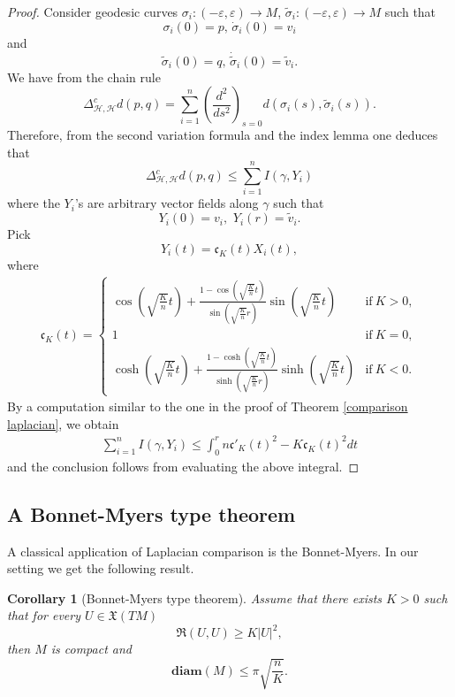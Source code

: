 \documentclass[11pt]{article}
\numberwithin{equation}{section}
\newtheorem{corollary}[theorem]{Corollary}
\newcommand{\Ho}{\mathcal H}
\begin{document}
\begin{proof}
Consider geodesic curves $\sigma_i:(-\varepsilon,\varepsilon) \to M$, $\tilde{\sigma}_i:(-\varepsilon, \varepsilon) \to M$ such that
\[
\sigma_i(0)=p, \,  \dot{\sigma}_i (0)=v_i
\]
and
\[
\tilde{\sigma}_i(0)=q, \,  \dot{\tilde{\sigma}}_i (0)=\tilde{v}_i.
\]
We have from the chain rule
\[
\Delta^c_{\Ho,\Ho} d (p,q) =\sum_{i=1}^{n} \left( \frac{d^2}{ds^2} \right)_{ s=0}  d( \sigma_i(s), \tilde{\sigma}_i(s)).
\]
Therefore, from the second variation formula \cite[Theorem 10.12]{Lee} and the index lemma one deduces that
\[
\Delta^c_{\Ho,\Ho} d (p,q) \le  \sum_{i=1}^n I(\gamma,Y_i)
\]
where the $Y_i$'s are arbitrary vector fields along $\gamma$ such that
\[
Y_i(0)=v_i, \, \, Y_i(r)=\tilde{v}_i.
\]
Pick
\[
Y_i(t)=\mathfrak{c}_K (t) X_i(t),
\]
where
\begin{align*}
\mathfrak{c}_K(t)= 
\begin{cases}
 \cos \left(\sqrt { \frac{K}{n}} t \right)  +\frac{1-\cos \left(\sqrt { \frac{K}{n}} t \right)}{\sin \left(\sqrt { \frac{K}{n}} r \right)}\sin \left(\sqrt { \frac{K}{n}} t \right)&\text{if}\ K>0,
\\
\displaystyle 1 &\text{if}\ K = 0,
\\
 \cosh \left(\sqrt { \frac{K}{n}} t \right)  +\frac{1-\cosh \left(\sqrt { \frac{K}{n}} t \right)}{\sinh \left(\sqrt { \frac{K}{n}} r \right)}\sinh \left(\sqrt { \frac{K}{n}} t \right) &\text{if}\ K<0.
\end{cases}
\end{align*}
By a computation similar to the one in the proof of Theorem \ref{comparison laplacian}, we obtain
\begin{align*}
\sum_{i=1}^n I(\gamma,Y_i) \le \int_0^r n  \mathfrak{c}'_K(t)^2- K \mathfrak{c}_K(t)^2  dt
\end{align*}
and the conclusion follows from evaluating the above integral.
\end{proof}

\subsection{A Bonnet-Myers type theorem}

A classical application of Laplacian comparison is the Bonnet-Myers. In our setting we get the following result.

\begin{corollary}[Bonnet-Myers type theorem]\label{BMyers}
Assume that there exists $K >0$ such that for every $U \in \mathfrak{X}(TM)$
\[
\mathfrak{R}(U,U) \ge K |U|^2,
\] 
then $M$ is compact and 
\[
\mathbf{diam} (M ) \le \pi \sqrt{ \frac{n}{K}}.
\]
\end{corollary}
\end{document}
